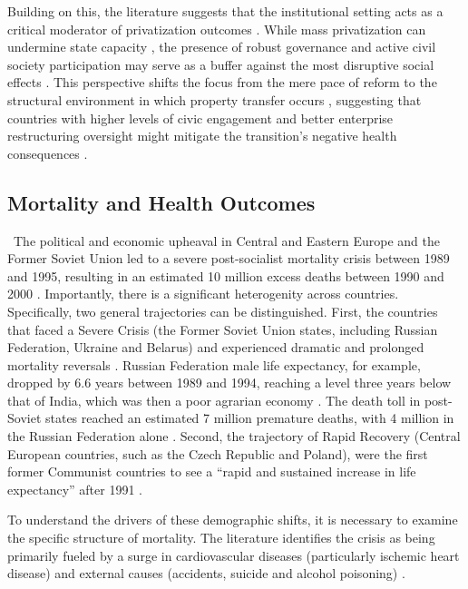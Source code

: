 \documentclass[en,magisterska]{pracamgr}
\begin{document}
Building on this, the literature suggests that the institutional setting acts as a critical moderator of privatization outcomes \citep{Cieslik2018, Denisova2009}. 
While mass privatization can undermine state capacity \citep{Hamm2012}, the presence of robust governance and active civil society participation may 
serve as a buffer against the most disruptive social effects \citep{Stuckler2009, Cornia2014}. This perspective shifts the focus from the mere pace of 
reform to the structural environment in which property transfer occurs \citep{Roland2001}, suggesting that countries with higher levels of civic engagement 
and better enterprise restructuring oversight might mitigate the transition’s negative health consequences \citep{Stuckler2009, EBRD1999}.



\subsection{Mortality and Health Outcomes}\
The political and economic upheaval in Central and Eastern Europe and the Former Soviet Union led to a severe post-socialist mortality crisis between 1989 and 1995, 
resulting in an estimated 10 million excess deaths between 1990 and 2000 \citep{Cornia2014}. Importantly, there is a significant heterogenity across countries. Specifically, 
two general trajectories can be distinguished. First, the countries that faced a Severe Crisis (the Former Soviet Union states, including Russian Federation, Ukraine and Belarus) and experienced dramatic and prolonged mortality reversals \citep{Eberstadt1999}. Russian Federation male life expectancy, for example, dropped by 6.6 years between 1989 and 1994, reaching a level three years below that of India,     which was then a poor agrarian economy \citep{Cornia2016}.  
    The death toll in post-Soviet states reached an estimated 7 million premature deaths, with 4 million in the Russian Federation alone \citep{Azarova2018}.
    Second, the trajectory of Rapid Recovery (Central European countries, such as the Czech Republic and Poland), were the first former Communist countries to see a 
    ``rapid and sustained increase in life expectancy'' after 1991 \citep{Fihel2011}.

To understand the drivers of these demographic shifts, it is necessary to examine the specific structure of mortality. 
The literature identifies the crisis as being primarily fueled by a surge in cardiovascular diseases (particularly ischemic heart disease) 
and external causes (accidents, suicide and alcohol poisoning) \citep{Cornia2014, Azarova2018}.
\end{document}

